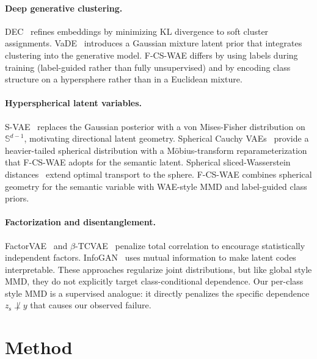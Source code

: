 \documentclass[10pt]{article}
\newcommand{\ours}{F-CS-WAE}
\newcommand{\zs}{z_{\mathrm{s}}}
\newcommand{\Sph}{\mathbb{S}}
\begin{document}
\paragraph{Deep generative clustering.}
DEC~\citep{xie2015unsupervised} refines embeddings by minimizing KL divergence to
soft cluster assignments.
VaDE~\citep{jiang2016variational} introduces a Gaussian mixture latent prior that
integrates clustering into the generative model.
\ours{} differs by using labels during training (label-guided rather than fully
unsupervised) and by encoding class structure on a hypersphere rather than in a
Euclidean mixture.

\paragraph{Hyperspherical latent variables.}
S-VAE~\citep{davidson2018hyperspherical} replaces the Gaussian posterior with a
von Mises-Fisher distribution on $\Sph^{d-1}$, motivating directional latent geometry.
Spherical Cauchy VAEs~\citep{sablica2025hyperspherical} provide a heavier-tailed
spherical distribution with a Möbius-transform reparameterization that \ours{}
adopts for the semantic latent.
Spherical sliced-Wasserstein distances~\citep{bonet2022spherical} extend optimal
transport to the sphere.
\ours{} combines spherical geometry for the semantic variable with WAE-style MMD
and label-guided class priors.

\paragraph{Factorization and disentanglement.}
FactorVAE~\citep{kim2018disentangling} and $\beta$-TCVAE~\citep{chen2018isolating}
penalize total correlation to encourage statistically independent factors.
InfoGAN~\citep{chen2016infogan} uses mutual information to make latent codes
interpretable.
These approaches regularize joint distributions, but like global style MMD, they do
not explicitly target class-conditional dependence.
Our per-class style MMD is a supervised analogue: it directly penalizes the
specific dependence $\zs\not\perp y$ that causes our observed failure.

\section{Method}
\label{sec:method}
\end{document}
